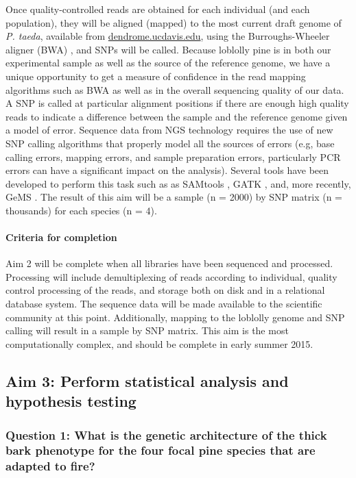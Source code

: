 Once quality-controlled reads are obtained for each individual (and each population), they will be aligned (mapped) to the 
most current draft genome of \emph{P. taeda}, available from \url{dendrome.ucdavis.edu}, using the Burroughs-Wheeler aligner 
(BWA) \citep{Li:2009fi}, and SNPs will be called.  Because loblolly pine is in both our experimental sample as well as the source 
of the reference genome, we have a unique opportunity to get a measure of confidence in the read mapping algorithms such as 
BWA as well as in the overall sequencing quality of our data.  A SNP is called at particular alignment positions if there are enough 
high quality reads to indicate a difference between the sample and the reference genome given a model of error. Sequence data 
from NGS technology requires the use of new SNP calling algorithms that properly model all the sources of errors (e.g, base 
calling errors, mapping errors, and sample preparation errors, particularly PCR errors can have a significant impact on the analysis).
Several tools have been developed to perform this task such as as SAMtools \citep{Li:2009ka}, GATK \citep{McKenna:2010bv}, and, 
more recently, GeMS \citep{You:2012iy}.   The result of this aim will be a sample (n = 2000) by SNP matrix (n = thousands) for each 
species (n = 4).  

\paragraph{Criteria for completion} Aim 2 will be complete when all libraries have been sequenced and processed.  Processing 
will include demultiplexing of reads according to individual, quality control processing of the reads, and storage both on disk and 
in a relational database system.  The sequence data will be made available to the scientific community at this point.  Additionally, 
mapping to the loblolly genome and SNP calling will result in a sample by SNP matrix.  This aim is the most computationally 
complex, and should be complete in early summer 2015.  

\subsection*{Aim 3: Perform statistical analysis and hypothesis testing}

\subsubsection*{Question 1: What is the genetic architecture of the thick bark phenotype for the four focal pine species that 
are adapted to fire?}


